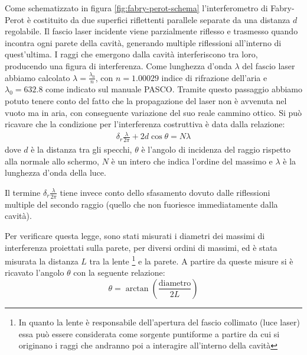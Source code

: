\documentclass[a4paper]{article}
\begin{document}
Come schematizzato in figura \ref{fig:fabry-perot-schema} l'interferometro di Fabry-Perot è costituito da due superfici riflettenti parallele separate da una distanza $d$ regolabile. Il fascio laser incidente viene parzialmente riflesso e trasmesso quando incontra ogni parete della cavità, generando multiple riflessioni all'interno di quest'ultima. I raggi che emergono dalla cavità interferiscono tra loro, producendo una figura di interferenza.
Come lunghezza d'onda $\lambda$ del fascio laser abbiamo calcolato $\lambda = \frac{\lambda_0}{n}$, con $n=1.00029$ indice di rifrazione dell'aria e $\lambda_0 = 632.8$ come indicato sul manuale PASCO. Tramite questo passaggio abbiamo potuto tenere conto del fatto che la propagazione del laser non è avvenuta nel vuoto ma in aria, con conseguente variazione del suo reale cammino ottico.
Si può ricavare che la condizione per l'interferenza costruttiva è data dalla relazione:
\begin{align}
   \delta_r\frac{\lambda}{2\pi}+ 2d \cos \theta = N\lambda
\label{eq: max interferenza fabry-perot}
\end{align}
dove $d$ è la distanza tra gli specchi, $\theta$ è l'angolo di incidenza del raggio rispetto alla normale allo schermo, $N$ è un intero che indica l'ordine del massimo e $\lambda$ è la lunghezza d'onda della luce.

Il termine $\delta_r\frac{\lambda}{2\pi}$ tiene invece conto dello sfasamento dovuto dalle riflessioni multiple del secondo raggio (quello che non fuoriesce immediatamente dalla cavità).

Per verificare questa legge, sono stati misurati i diametri dei massimi di interferenza proiettati sulla parete, per diversi ordini di massimi, ed è stata misurata la distanza $L$ tra la lente \footnote{In quanto la lente è responsabile dell'apertura del fascio collimato (luce laser) essa può essere considerata come sorgente puntiforme a partire da cui si originano i raggi che andranno poi a interagire all'interno della cavità} e la parete. A partire da queste misure si è ricavato l'angolo $\theta$ con la seguente relazione:
\[\theta = \arctan \left(\frac{\text{diametro}}{2L}\right)\]
\end{document}
